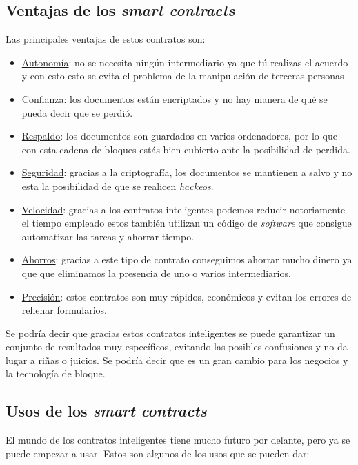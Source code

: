 \subsection{Ventajas de los \textit{smart contracts}}

Las principales ventajas de estos contratos son: 

\begin{itemize}
	\item \underline{Autonomía}: no se necesita ningún intermediario ya que tú realizas el acuerdo y con esto esto se evita el problema de la manipulación de terceras personas
	\item \underline{Confianza}: los documentos están encriptados y no hay manera de qué se pueda decir que se perdió. 
	\item \underline{Respaldo}: los documentos son guardados en varios ordenadores, por lo que con esta cadena de bloques estás bien cubierto ante la posibilidad de perdida.
	\item \underline{Seguridad}: gracias a la criptografía, los documentos se mantienen a salvo y no esta la posibilidad de que se realicen \textit{hackeos}. 
	\item \underline{Velocidad}: gracias a los contratos inteligentes podemos reducir notoriamente el tiempo empleado estos también utilizan un código de \textit{software} que consigue automatizar las tareas y ahorrar tiempo. 
	\item \underline{Ahorros}: gracias a este tipo de contrato conseguimos ahorrar mucho dinero ya que que eliminamos la presencia de uno o varios intermediarios. 
	\item \underline{Precisión}: estos contratos son muy rápidos, económicos y evitan los errores de rellenar formularios.
\end{itemize}

Se podría decir que gracias estos contratos inteligentes se puede garantizar un conjunto de resultados muy específicos, evitando las posibles confusiones y no da lugar a riñas o juicios. Se podría decir que es un gran cambio para los negocios y la tecnología de bloque. 

\subsection{Usos de los \textit{smart contracts}}

El mundo de los contratos inteligentes tiene mucho futuro por delante, pero ya se puede empezar a usar. Estos son algunos de los usos que se pueden dar:

